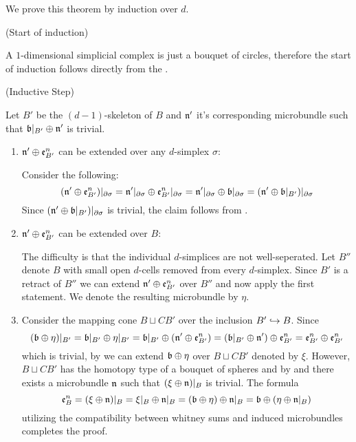 \begin{myproof}
    We prove this theorem by induction over $d$.

    (Start of induction)

    A $1$-dimensional simplicial complex is just a bouquet of circles, therefore
    the start of induction follows directly from the .   

    (Inductive Step)

    Let $B'$ be the $(d - 1)$-skeleton of $B$ and $\mathfrak{n}'$ it's corresponding microbundle
    such that $\mathfrak{b}\vert_{B'} \oplus \mathfrak{n}'$ is trivial.

    \begin{enumerate}
        \item $\mathfrak{n}' \oplus \mathfrak{e}^{n}_{B'}$ can be extended over any $d$-simplex $\sigma$:

        Consider the following:
        \[
            (\mathfrak{n}' \oplus \mathfrak{e}^{n}_{B'})\vert_{\partial\sigma}
            = \mathfrak{n}'\vert_{\partial\sigma} \oplus \mathfrak{e}^{n}_{B'}\vert_{\partial\sigma}
            = \mathfrak{n}'\vert_{\partial\sigma} \oplus \mathfrak{b}\vert_{\partial\sigma}
            = (\mathfrak{n}' \oplus \mathfrak{b}\vert_{B'})\vert_{\partial\sigma}
        \]
        Since $(\mathfrak{n}' \oplus \mathfrak{b}\vert_{B'})\vert_{\partial\sigma}$ is trivial, the claim follows from .

        \item $\mathfrak{n}' \oplus \mathfrak{e}^{n}_{B'}$ can be extended over $B$:

        The difficulty is that the individual $d$-simplices are not well-seperated.
        Let $B''$ denote $B$ with small open $d$-cells removed from every $d$-simplex.
        Since $B'$ is a retract of $B''$ we can extend $\mathfrak{n}' \oplus \mathfrak{e}^{n}_{B'}$ over $B''$ and now apply the first statement.
        We denote the resulting microbundle by $\eta$.

        \item
        Consider the mapping cone $B \sqcup CB'$ over the inclusion $B' \hookrightarrow{} B$.
        Since
        \[
            (\mathfrak{b} \oplus \eta)\vert_{B'}
            = \mathfrak{b}\vert_{B'} \oplus \eta\vert_{B'}
            = \mathfrak{b}\vert_{B'} \oplus (\mathfrak{n}' \oplus \mathfrak{e}^{n}_{B'})
            = (\mathfrak{b}\vert_{B'} \oplus \mathfrak{n}') \oplus \mathfrak{e}^{n}_{B'}
            = \mathfrak{e}^{n}_{B'} \oplus \mathfrak{e}^{n}_{B'}
        \]
        which is trivial, by  we can extend $\mathfrak{b} \oplus \eta$ over $B \sqcup CB'$ denoted by $\xi$.
        However, $B \sqcup CB'$ has the homotopy type of a bouquet of spheres and by  and  there exists a microbundle $\mathfrak{n}$ such that $(\xi \oplus \mathfrak{n})\vert_{B}$ is trivial.
        The formula
        \[
            \mathfrak{e}^{n}_{B}
            = (\xi \oplus \mathfrak{n})\vert_{B}
            = \xi\vert_{B} \oplus \mathfrak{n}\vert_{B}
            = (\mathfrak{b} \oplus \eta) \oplus \mathfrak{n}\vert_{B}
            = \mathfrak{b} \oplus (\eta \oplus \mathfrak{n}\vert_{B})
        \]
        utilizing the compatibility between whitney sums and induced microbundles completes the proof.
    \end{enumerate}
\end{myproof}